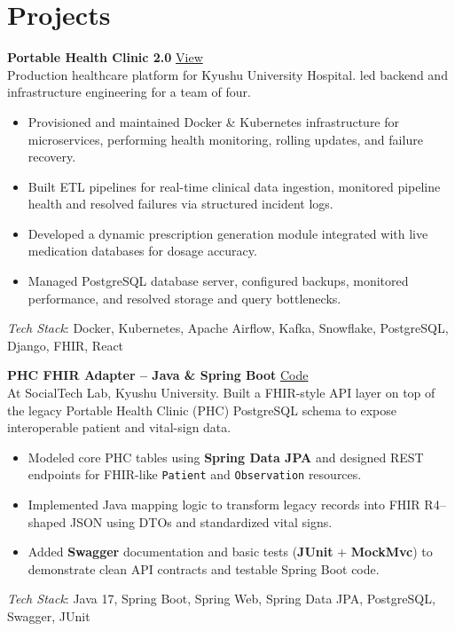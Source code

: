 \documentclass[a4paper,11pt]{article}
\begin{document}
\section*{Projects}

\textbf{Portable Health Clinic 2.0}
\hfill
\href{https://portable-healthcare-clinic-2.netlify.app/}{View} \\
Production healthcare platform for Kyushu University Hospital. led backend and infrastructure engineering for a team of four.
\begin{itemize}[leftmargin=*, noitemsep, nolistsep]
    \item  Provisioned and maintained Docker \& Kubernetes infrastructure for microservices, performing health monitoring, rolling updates, and failure recovery.
    \item Built ETL pipelines for real-time clinical data ingestion, monitored pipeline health and resolved failures via structured incident logs.
    \item Developed a dynamic prescription generation module integrated with live medication databases for dosage accuracy.
    \item Managed PostgreSQL database server, configured backups, monitored performance, and resolved storage and query bottlenecks.

\end{itemize}
\textit{Tech Stack}:  Docker, Kubernetes, Apache Airflow, Kafka, Snowflake, PostgreSQL, Django, FHIR, React
\vspace{6pt}

\textbf{PHC FHIR Adapter – Java \& Spring Boot}
\hfill
\href{https://github.com/usama-shiranai90/phc-fhir-adapter}{Code} \\
At SocialTech Lab, Kyushu University. Built a FHIR-style API layer on top of the legacy Portable Health Clinic (PHC) PostgreSQL schema to expose interoperable patient and vital-sign data.
\begin{itemize}[leftmargin=*, noitemsep, nolistsep]
    \item Modeled core PHC tables using \textbf{Spring Data JPA} and designed REST endpoints for FHIR-like \texttt{Patient} and \texttt{Observation} resources.
    \item Implemented Java mapping logic to transform legacy records into FHIR R4–shaped JSON using DTOs and standardized vital signs.
    \item Added \textbf{Swagger} documentation and basic tests (\textbf{JUnit} + \textbf{MockMvc}) to demonstrate clean API contracts and testable Spring Boot code.
\end{itemize}
\textit{Tech Stack}: Java 17, Spring Boot, Spring Web, Spring Data JPA, PostgreSQL, Swagger, JUnit
\end{document}
